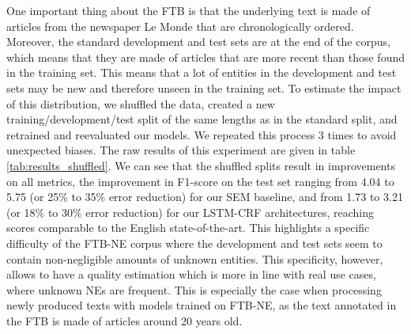 One important thing about the FTB is that the underlying text is made of articles from the newspaper Le Monde that are chronologically ordered. Moreover, the standard development and test sets are at the end of the corpus, which means that they are made of articles that are more recent than those found in the training set. This means that a lot of entities in the development and test sets may be new and therefore unseen in the training set. To estimate the impact of this distribution, we shuffled the data, created a new training/development/test split of the same lengths as in the standard split, and retrained and reevaluated our models. We repeated this process 3 times to avoid unexpected biases. The raw results of this experiment are given in table \ref{tab:results_shuffled}. We can see that the shuffled splits result in improvements on all metrics, the improvement in F1-score on the test set ranging from 4.04 to 5.75 (or 25\% to 35\% error reduction) for our SEM baseline, and from 1.73 to 3.21 (or 18\% to 30\% error reduction) for our LSTM-CRF architectures, reaching scores comparable to the English state-of-the-art. This highlights a specific difficulty of the FTB-NE corpus where the development and test sets seem to contain non-negligible amounts of unknown entities. This specificity, however, allows to have a quality estimation which is more in line with real use cases, where unknown NEs are frequent. This is especially the case when processing newly produced texts with models trained on FTB-NE, as the text annotated in the FTB is made of articles around 20 years old.

